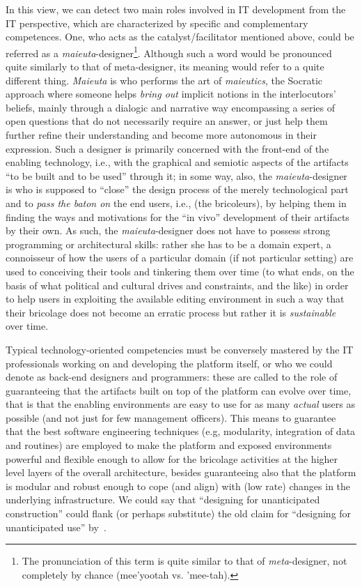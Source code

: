 \documentclass{article}
\begin{document}
In this view, we can detect two main roles involved in IT development from the IT perspective, which are characterized by specific and complementary competences. One, who acts as the catalyst/facilitator mentioned above, could be referred as a \emph{maieuta}-designer\footnote{The pronunciation of this term is quite similar to that of \emph{meta}-designer, not completely by chance (mee'yootah vs. 'mee-tah).}. Although such a word would be pronounced quite similarly to that of meta-designer, its meaning would refer to a quite different thing. \emph{Maieuta} is who performs the art of \emph{maieutics}, the Socratic approach where someone helps \emph{bring out} implicit notions in the interlocutors' beliefs, mainly through a dialogic and narrative way encompassing a series of open questions that do not necessarily require an answer, or just help them further refine their understanding and become more autonomous in their expression. Such a designer is primarily concerned with the front-end of the enabling technology, i.e., with the graphical and semiotic aspects of the artifacts ``to be built and to be used'' through it; in some way, also, the \emph{maieuta}-designer is who is supposed to ``close'' the design process of the merely technological part and to \emph{pass the baton on} the end users, i.e., (the bricoleurs), by helping them in finding the ways and motivations for the ``in vivo'' development of their artifacts by their own. As such, the \emph{maieuta}-designer does not have to possess strong programming or architectural skills: rather she has to be a domain expert, a connoisseur of how the users of a particular domain (if not particular setting) are used to conceiving their tools and tinkering them over time (to what ends, on the basis of what political and cultural drives and constraints, and the like) in order to help users in exploiting the available editing environment in such a way that their bricolage does not become an erratic process but rather it is \emph{sustainable} over time. 

Typical technology-oriented competencies must be conversely mastered by the IT professionals working on and developing the platform itself, or who we could denote as back-end designers and programmers: these are called to the role of guaranteeing that the artifacts built on top of the platform can evolve over time, that is that the enabling environments are easy to use for as many \emph{actual} users as possible (and not just for few management officers). This means to guarantee that the best software engineering techniques (e.g, modularity, integration of data and routines) are employed to make the platform and exposed environments powerful and flexible enough to allow for the bricolage activities at the higher level layers of the overall architecture, besides guaranteeing also that the platform is modular and robust enough to cope (and align) with (low rate) changes in the underlying infrastructure. We could say that ``designing for unanticipated construction'' could flank (or perhaps substitute) the old claim for ``designing for unanticipated use'' by~\citet{robinson_design_1993}.
\end{document}
